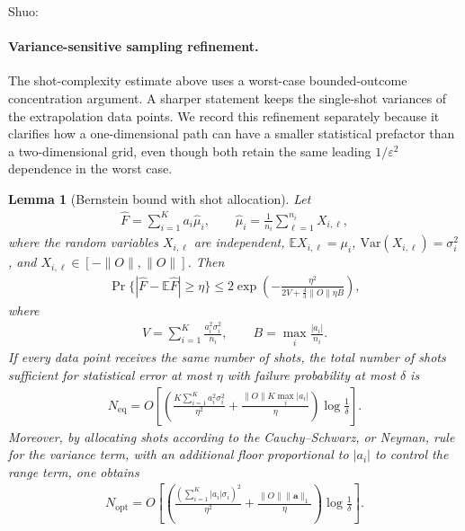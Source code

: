 \documentclass[aps,pra,reprint,groupedaddress,floatfix]{revtex4-2}
\newtheorem{lemma}{Lemma}
\newcommand{\eps}{\varepsilon}
\newcommand{\mb}{\mathbb}
\newcommand{\sz}[1]{{\color{blue} Shuo: #1}}
\begin{document}
\sz{\paragraph{Variance-sensitive sampling refinement.}
The shot-complexity estimate above uses a worst-case bounded-outcome concentration argument. A sharper statement keeps the single-shot variances of the extrapolation data points. We record this refinement separately because it clarifies how a one-dimensional path can have a smaller statistical prefactor than a two-dimensional grid, even though both retain the same leading $1/\eps^2$ dependence in the worst case.
}
\begin{lemma}[Bernstein bound with shot allocation]
\label{lem:bernstein-shot-allocation}
Let
\begin{align*}
    \widehat F=\sum_{i=1}^{K}a_i\widehat \mu_i,
    \qquad
    \widehat\mu_i=\frac{1}{n_i}\sum_{\ell=1}^{n_i}X_{i,\ell},
\end{align*}
where the random variables $X_{i,\ell}$ are independent, $\mb E X_{i,\ell}=\mu_i$, $\mathrm{Var}(X_{i,\ell})=\sigma_i^2$, and $X_{i,\ell}\in[-\|O\|,\|O\|]$. Then
\begin{align}
\label{eq:bernstein-linear-estimator}
    \Pr\{|\widehat F-\mb E\widehat F|\ge \eta\}
    \le
    2\exp\left(
    -\frac{\eta^2}{2V+\frac{4}{3}\|O\|\eta B}
    \right),
\end{align}
where
\begin{align*}
    V=\sum_{i=1}^{K}\frac{a_i^2\sigma_i^2}{n_i},
    \qquad
    B=\max_i\frac{|a_i|}{n_i}.
\end{align*}
If every data point receives the same number of shots, the total number of shots sufficient for statistical error at most $\eta$ with failure probability at most $\delta$ is
\begin{align}
\label{eq:equal-shot-bound}
    N_{\mathrm{eq}}
    =
    O\left[
    \left(
    \frac{K\sum_{i=1}^K a_i^2\sigma_i^2}{\eta^2}
    +
    \frac{\|O\|K\max_i|a_i|}{\eta}
    \right)
    \log\frac{1}{\delta}
    \right].
\end{align}
Moreover, by allocating shots according to the Cauchy--Schwarz, or Neyman, rule for the variance term, with an additional floor proportional to $|a_i|$ to control the range term, one obtains
\begin{align}
\label{eq:optimized-shot-bound}
    N_{\mathrm{opt}}
    =
    O\left[
    \left(
    \frac{\left(\sum_{i=1}^{K}|a_i|\sigma_i\right)^2}{\eta^2}
    +
    \frac{\|O\|\|\mathbf a\|_1}{\eta}
    \right)
    \log\frac{1}{\delta}
    \right].
\end{align}
\end{lemma}
\end{document}
